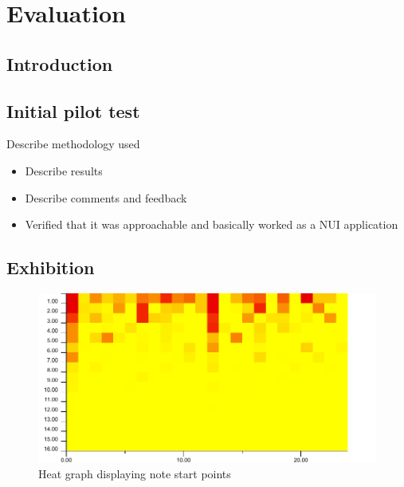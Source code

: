 \documentclass[]{article}
\date{}
\providecommand{\tightlist}{%
  \setlength{\itemsep}{0pt}\setlength{\parskip}{0pt}}
\begin{document}
\section{Evaluation}\label{evaluation}

\subsection{Introduction}\label{introduction}

\subsection{Initial pilot test}\label{initial-pilot-test}

\begin{description}
\tightlist
\item[Introduction]
Describe methodology used
\end{description}

\begin{itemize}
\tightlist
\item
  Describe results
\item
  Describe comments and feedback
\item
  Verified that it was approachable and basically worked as a NUI
  application
\end{itemize}

\subsection{Exhibition}\label{exhibition}

\begin{figure}[h]
\centering
\includegraphics[width=1.0\textwidth]{./assets/hm-yellow-red.pdf}
\caption{Heat graph displaying note start points}
\label{fig:note-onset-hm}
\end{figure}
\end{document}
